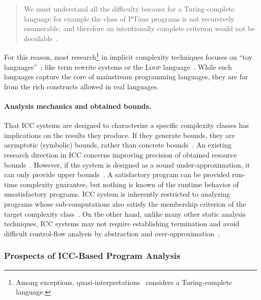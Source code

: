 \begin{quotation}
\noindent We must understand all the diﬃculty because for a Turing-complete language for example the class of PTime programs is not recursively enumerable, and therefore an intentionally complete criterion would not be decidable~\cite[Sect. 4.1]{mogbil2012}.
\end{quotation}

\noindent For this reason, most research\footnote{
Among exceptions, quasi-interpretations~\cite{marion2000} considers a Turing-complete language.}
in implicit complexity techniques focuses on \enquote{toy languages}~\cite{moyen2017,rubiano17};
like term rewrite systems or the \textsc{Loop} language~\cite{kristiansen2005}.
While such languages capture the core of mainstream programming languages, they are far from the rich constructs allowed in real languages.

\paragraph*{Analysis mechanics and obtained bounds.}
That ICC systems are designed to characterize a specific complexity classes has implications on the results they produce.
If they generate bounds, they are asymptotic (symbolic) bounds, rather than concrete bounds~\cite{baillot2019}.
An existing research direction in ICC concerns improving precision of obtained resource bounds~\cite{benamram2020}.
However, if the system is designed as a sound under-approximation, it can only provide upper bounds~\cite[p. 119]{moyen2017}.
A satisfactory program can be provided run-time complexity guarantee, but nothing is known of the runtime behavior of unsatisfactory programs.
ICC system is inherently restricted to analyzing programs whose sub-computations also satisfy the membership criterion of the target complexity class~\cite{baillot2019}.
On the other hand, unlike many other static analysis techniques,
ICC systems may not require establishing termination and avoid difficult control-flow analysis by abstraction and over-approximation~\cite{jones2009}.

\subsubsection{Prospects of ICC-Based Program Analysis}

